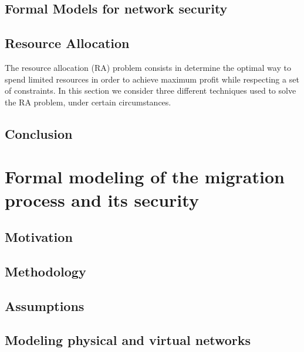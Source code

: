 \documentclass[a4paper, 11pt]{article}
\begin{document}


\subsection{Formal Models for network security}



\subsection{Resource Allocation}
The resource allocation (RA) problem consists in determine the optimal way to spend limited resources in order to achieve maximum profit while respecting a set of constraints.
In this section we consider three different techniques used to solve the RA problem, under certain circumstances. 






\subsection{Conclusion}


\newpage
\section{Formal modeling of the migration process and its security}
\label{sec:formal_model}
\subsection{Motivation}


\subsection{Methodology}


\subsection{Assumptions}


\subsection{Modeling physical and virtual networks}

\end{document}

